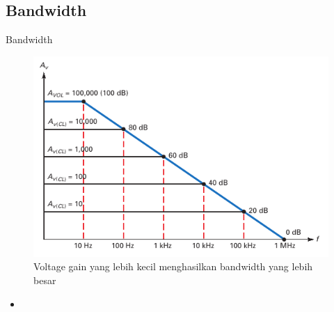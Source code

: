 \subsection{Bandwidth}
\begin{frame}{Bandwidth}
	\begin{multicols}{2}
		\begin{figure}
			\centering
			\includegraphics[height=0.6\textheight]{gambar/fig-16.15}
			\caption{Voltage gain yang lebih kecil menghasilkan bandwidth yang lebih besar}
			\label{fig-16.15}
		\end{figure}
	\columnbreak
		\begin{itemize}
			\item 
		\end{itemize}
	\end{multicols}
\end{frame}